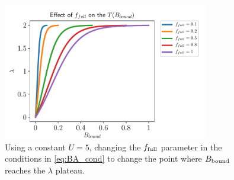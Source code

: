 \begin{figure}[!ht]
    \centering
    \includegraphics[width=0.8\textwidth]{figures/T_Bbound_f_full.pdf}
    \caption{
        \label{fig:T_Bbound_f_full}
        Using a constant $U = 5$, changing the $f_{\text{full}}$ parameter in the conditions in \eqref{eq:BA_cond} to change the point where $B_{\text{bound}}$ reaches the $\lambda$ plateau.
    }
\end{figure}

